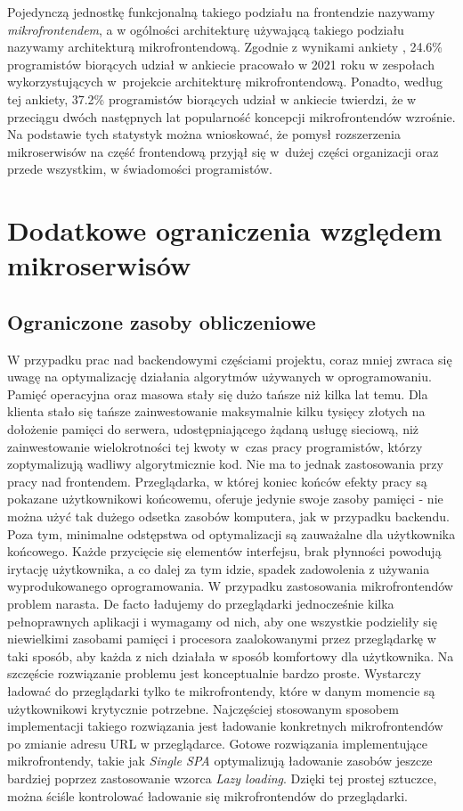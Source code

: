 \documentclass{SGGW-thesis}
\begin{document}
Pojedynczą jednostkę funkcjonalną takiego podziału na frontendzie nazywamy \textit{mikrofrontendem}, a w ogólności architekturę używającą takiego podziału nazywamy architekturą mikrofrontendową.
Zgodnie z wynikami ankiety \cite{tsh_2022}, 24.6\% programistów biorących udział w ankiecie pracowało w 2021 roku w zespołach wykorzystujących w~projekcie architekturę mikrofrontendową. Ponadto, według tej ankiety, 37.2\% programistów biorących udział w ankiecie twierdzi, że w przeciągu dwóch następnych lat popularność koncepcji mikrofrontendów wzrośnie. Na podstawie tych statystyk można wnioskować, że pomysł rozszerzenia mikroserwisów na część frontendową przyjął się w~dużej części organizacji oraz przede wszystkim, w świadomości programistów.

\section{Dodatkowe ograniczenia względem mikroserwisów}
\subsection{Ograniczone zasoby obliczeniowe}
W przypadku prac nad backendowymi częściami projektu, coraz mniej zwraca się uwagę na optymalizację działania algorytmów używanych w oprogramowaniu. Pamięć operacyjna oraz masowa stały się dużo tańsze niż kilka lat temu. Dla klienta stało się tańsze zainwestowanie maksymalnie kilku tysięcy złotych na dołożenie pamięci do serwera, udostępniającego żądaną usługę sieciową, niż zainwestowanie wielokrotności tej kwoty w~czas pracy programistów, którzy zoptymalizują wadliwy algorytmicznie kod.
Nie ma to jednak zastosowania przy pracy nad frontendem. Przeglądarka, w której koniec końców efekty pracy są pokazane użytkownikowi końcowemu, oferuje jedynie swoje zasoby pamięci - nie można użyć tak dużego odsetka zasobów komputera, jak w przypadku backendu. Poza tym, minimalne odstępstwa od optymalizacji są zauważalne dla użytkownika końcowego. Każde przycięcie się elementów interfejsu, brak płynności powodują irytację użytkownika, a co dalej za tym idzie, spadek zadowolenia z używania wyprodukowanego oprogramowania. W przypadku zastosowania mikrofrontendów problem narasta. De facto ładujemy do przeglądarki jednocześnie kilka pełnoprawnych aplikacji i wymagamy od nich, aby one wszystkie podzieliły się niewielkimi zasobami pamięci i procesora zaalokowanymi przez przeglądarkę w taki sposób, aby każda z nich działała w sposób komfortowy dla użytkownika. Na szczęście rozwiązanie problemu jest konceptualnie bardzo proste. Wystarczy ładować do przeglądarki tylko te mikrofrontendy, które w danym momencie są użytkownikowi krytycznie potrzebne. Najczęściej stosowanym sposobem implementacji takiego rozwiązania jest ładowanie konkretnych mikrofrontendów po zmianie adresu URL w przeglądarce. Gotowe rozwiązania implementujące mikrofrontendy, takie jak \textit{Single SPA} optymalizują ładowanie zasobów jeszcze bardziej poprzez zastosowanie wzorca \textit{Lazy loading}. Dzięki tej prostej sztuczce, można ściśle kontrolować ładowanie się mikrofrontendów do przeglądarki.
\end{document}
